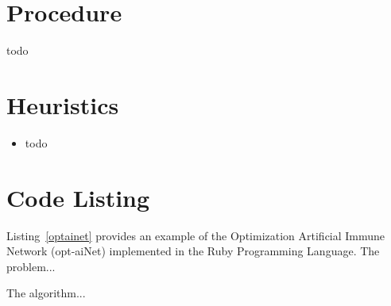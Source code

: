 \documentclass[a4paper, 11pt]{article}
\begin{document}
\section{Procedure}
\label{sec:procedure}
todo

\section{Heuristics}
\label{sec:heuristics}
\begin{itemize}
	\item todo
\end{itemize}

\section{Code Listing}
\label{sec:code}
Listing~\ref{optainet} provides an example of the Optimization Artificial Immune Network (opt-aiNet) implemented in the Ruby Programming Language.
The problem...

The algorithm...


\end{document}
